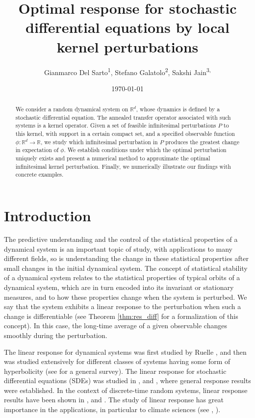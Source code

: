 \documentclass{amsart}
\title[Optimal response for SDE by local kernel perturbations]{Optimal response for stochastic differential equations by local kernel perturbations}
\author{Gianmarco Del Sarto\textsuperscript{1}, Stefano Galatolo\textsuperscript{2}, Sakshi Jain\textsuperscript{3, \Letter}}
\date{\today}
\begin{document}
\maketitle 
\begin{abstract} 
  We consider a random dynamical system on $\mathbb{R}^d$, whose dynamics is defined by a stochastic differential equation. The annealed transfer operator associated with such systems is a kernel operator. Given a set of feasible infinitesimal perturbations $P$ to this kernel, with support in a certain compact set, and a specified observable function $\phi: \mathbb{R}^d \to \mathbb{R}$, we study which infinitesimal perturbation in $P$ produces the greatest change in expectation of $\phi$. We establish conditions under which the optimal perturbation uniquely exists and present a numerical method to approximate the optimal infinitesimal kernel perturbation. Finally, we numerically illustrate our findings with concrete examples.
\end{abstract}

\tableofcontents

\section{Introduction}\label{sec:intro}
 The predictive understanding and the control of the statistical properties  of a  dynamical system is an important topic of study, with applications to  many different fields, so is understanding the change in these statistical properties after small changes in the initial dynamical system.
The concept of statistical stability of a dynamical system relates to the statistical properties of typical orbits of a dynamical system, which are in turn encoded into its invariant or stationary measures, and to how these properties change when the system is perturbed. We say that the system exhibits a linear response to the perturbation when such a change is differentiable (see Theorem \ref{thm:res_diff} for a formalization of this concept).
In this case, the long-time average of a given observable  changes smoothly during the perturbation. 

 The linear response for dynamical systems was first studied by Ruelle \cite{Ruelle97}, and then was studied extensively for different classes of systems having some form of hyperbolicity (see \cite{Baladi14} for a general survey). The linear response for stochastic differential equations (SDEs) was studied in \cite{HM10}, \cite{KLP} and \cite{CKB22}, where general response results were established.
In the context of discrete-time random systems, linear response results have been shown in \cite{GG19}, \cite{BRS20}  and \cite{AFG22}. The study of linear response has great importance in the applications, in particular to climate sciences (see \cite{GL20}, \cite{HM10}).
\end{document}
